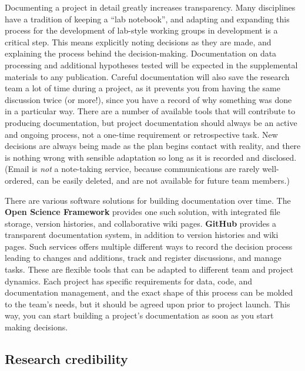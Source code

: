 Documenting a project in detail greatly increases transparency.
Many disciplines have a tradition of keeping a ``lab notebook'',
and adapting and expanding this process for the development
of lab-style working groups in development is a critical step.
This means explicitly noting decisions as they are made,
and explaining the process behind the decision-making.
Documentation on data processing and additional hypotheses tested
will be expected in the supplemental materials to any publication.
Careful documentation will also save the research team a lot of time during a project,
as it prevents you from having the same discussion twice (or more!),
since you have a record of why something was done in a particular way.
There are a number of available tools
that will contribute to producing documentation,
but project documentation should always be an active and ongoing process,
not a one-time requirement or retrospective task.
New decisions are always being made as the plan begins contact with reality,
and there is nothing wrong with sensible adaptation so long as it is recorded and disclosed.
(Email is \textit{not} a note-taking service, because communications are rarely well-ordered,
can be easily deleted, and are not available for future team members.)

There are various software solutions for building documentation over time.
The \textbf{Open Science Framework} provides one such solution,
with integrated file storage, version histories, and collaborative wiki pages.
\textbf{GitHub} provides a transparent documentation system,
in addition to version histories and wiki pages.
Such services offers multiple different ways
to record the decision process leading to changes and additions,
track and register discussions, and manage tasks.
These are flexible tools that can be adapted to different team and project dynamics.
Each project has specific requirements for data, code, and documentation management,
and the exact shape of this process can be molded to the team's needs,
but it should be agreed upon prior to project launch.
This way, you can start building a project's documentation as soon as you start making decisions.

\subsection{Research credibility}

